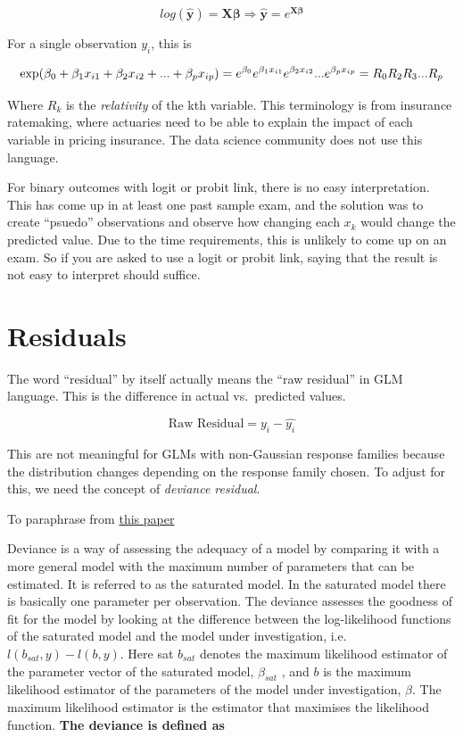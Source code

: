 \documentclass[openany]{book}
\begin{document}
\[
log(\mathbf{\hat{y}}) = \mathbf{X} \mathbf{\beta} \Rightarrow \mathbf{\hat{y}} = e^{\mathbf{X} \mathbf{\beta}}
\]

For a single observation \(y_i\), this is

\[
\text{exp}(\beta_0 + \beta_1 x_{i1} + \beta_2 x_{i2} + ... + \beta_p x_{ip}) = \\
e^{\beta_0} e^{\beta_1 x_{i1}}e^{\beta_2 x_{i2}} ...  e^{\beta_p x_{ip}} = 
R_0 R_2 R_3 ... R_{p}
\]

Where \(R_k\) is the \emph{relativity} of the kth variable. This terminology is from insurance ratemaking, where actuaries need to be able to explain the impact of each variable in pricing insurance. The data science community does not use this language.

For binary outcomes with logit or probit link, there is no easy interpretation. This has come up in at least one past sample exam, and the solution was to create ``psuedo'' observations and observe how changing each \(x_k\) would change the predicted value. Due to the time requirements, this is unlikely to come up on an exam. So if you are asked to use a logit or probit link, saying that the result is not easy to interpret should suffice.

\hypertarget{residuals}{%
\section{Residuals}\label{residuals}}

The word ``residual'' by itself actually means the ``raw residual'' in GLM language. This is the difference in actual vs.~predicted values.

\[\text{Raw Residual} = y_i - \hat{y_i}\]

This are not meaningful for GLMs with non-Gaussian response families because the distribution changes depending on the response family chosen. To adjust for this, we need the concept of \emph{deviance residual}.

To paraphrase from \href{www.stats.ox.ac.uk/pub/bdr/IAUL/ModellingLecture5.pdf}{this paper}

Deviance is a way of assessing the adequacy of a model by comparing it with a more general
model with the maximum number of parameters that can be estimated. It is referred to
as the saturated model. In the saturated model there is basically one parameter per
observation. The deviance assesses the goodness of fit for the model by looking at the
difference between the log-likelihood functions of the saturated model and the model
under investigation, i.e.~\(l(b_{sat},y) - l(b,y)\). Here sat \(b_{sat}\) denotes the maximum likelihood
estimator of the parameter vector of the saturated model, \(\beta_{sat}\) , and \(b\) is the maximum
likelihood estimator of the parameters of the model under investigation, \(\beta\). The maximum likelihood estimator is the estimator that maximises the likelihood function. \textbf{The deviance is defined as}
\end{document}

